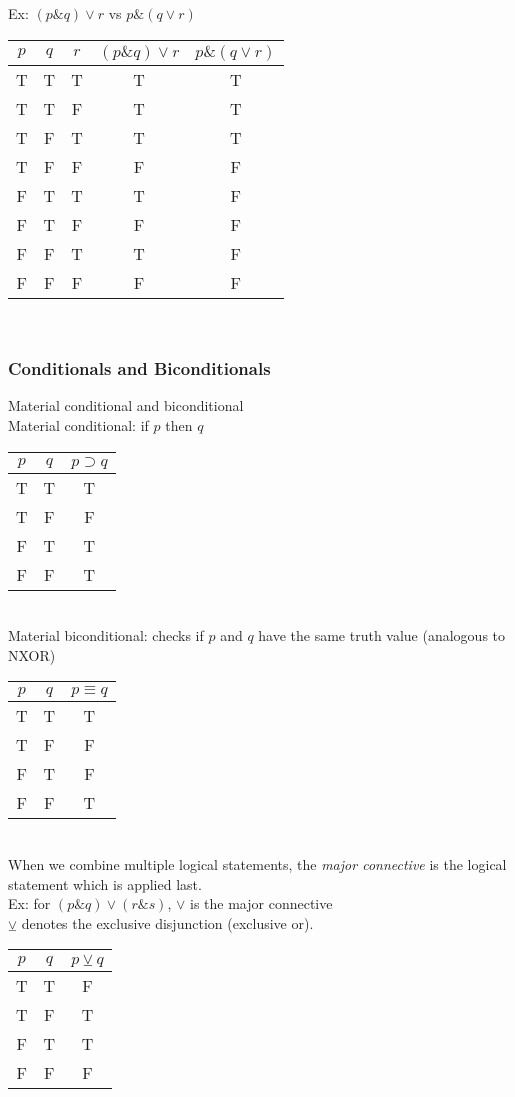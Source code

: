 Ex: $(p\&q)\vee r$ vs $p\&(q\vee r)$\\
\begin{tabular}{c|c|c|c|c}
    $p$ & $q$ & $r$ & $(p\&q)\vee r$ & $p\&(q\vee r)$\\
    \hline
    T & T & T & T & T\\
    T & T & F & T & T\\
    T & F & T & T & T\\
    T & F & F & F & F\\
    F & T & T & T & F\\
    F & T & F & F & F\\
    F & F & T & T & F\\
    F & F & F & F & F
\end{tabular}\\

\subsubsection{Conditionals and Biconditionals}
Material conditional and biconditional\\
Material conditional: if $p$ then $q$\\
\begin{tabular}{c|c|c}
    $p$ & $q$ & $p\supset q$\\
    \hline
    T & T & T\\
    T & F & F\\
    F & T & T\\
    F & F & T
\end{tabular}\\

Material biconditional: checks if $p$ and $q$ have the same truth value (analogous to NXOR)\\
\begin{tabular}{c|c|c}
    $p$ & $q$ & $p\equiv q$\\
    \hline
    T & T & T\\
    T & F & F\\
    F & T & F\\
    F & F & T
\end{tabular}\\

When we combine multiple logical statements, the \textit{major connective} is the logical statement which is applied last.\\
Ex: for $(p\&q)\vee(r\&s)$, $\vee$ is the major connective\\

$\veebar$ denotes the exclusive disjunction (exclusive or).\\
\begin{tabular}{c|c|c}
    $p$ & $q$ & $p\veebar q$\\
    \hline
    T & T & F\\
    T & F & T\\
    F & T & T\\
    F & F & F
\end{tabular}\\

